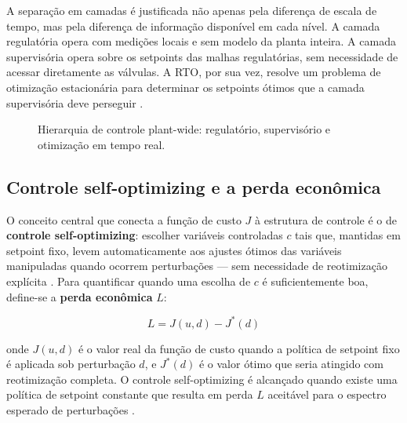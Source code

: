 A separação em camadas é justificada não apenas pela diferença de escala de tempo, mas pela
diferença de informação disponível em cada nível. A camada regulatória opera com medições locais e
sem modelo da planta inteira. A camada supervisória opera sobre os setpoints das malhas regulatórias,
sem necessidade de acessar diretamente as válvulas. A RTO, por sua vez, resolve um problema de
otimização estacionária para determinar os setpoints ótimos que a camada supervisória deve perseguir
\cite{Skogestad2004}.

\begin{figure}[htbp]
	\centering
	\caption{Hierarquia de controle plant-wide: regulatório, supervisório e otimização em tempo real.}
	\label{fig:plantwide_hierarchy}
\end{figure}

\subsection{Controle self-optimizing e a perda econômica}

O conceito central que conecta a função de custo $J$ à estrutura de controle é o de
\textbf{controle self-optimizing}: escolher variáveis controladas $c$ tais que, mantidas em setpoint
fixo, levem automaticamente aos ajustes ótimos das variáveis manipuladas quando ocorrem perturbações
--- sem necessidade de reotimização explícita \cite{Skogestad2004}. Para quantificar quando uma
escolha de $c$ é suficientemente boa, define-se a \textbf{perda econômica} $L$:

\begin{equation}
	L = J(u, d) - J^*(d)
	\label{eq:loss}
\end{equation}

\noindent onde $J(u,d)$ é o valor real da função de custo quando a política de setpoint fixo é
aplicada sob perturbação $d$, e $J^*(d)$ é o valor ótimo que seria atingido com reotimização
completa. O controle self-optimizing é alcançado quando existe uma política de setpoint constante
que resulta em perda $L$ aceitável para o espectro esperado de perturbações \cite{Skogestad2004}.

